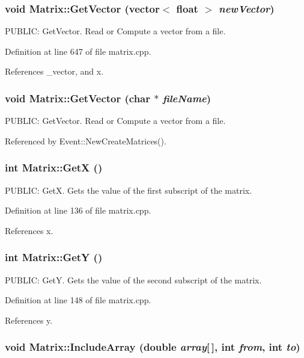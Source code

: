 \subsubsection{\setlength{\rightskip}{0pt plus 5cm}void Matrix::Get\-Vector (vector$<$ float $>$ {\em new\-Vector})}\label{classMatrix_a7}


PUBLIC: Get\-Vector. Read or Compute a vector from a file. 

Definition at line 647 of file matrix.cpp.

References \_\-vector, and x.
\subsubsection{\setlength{\rightskip}{0pt plus 5cm}void Matrix::Get\-Vector (char $\ast$ {\em file\-Name})}\label{classMatrix_a6}


PUBLIC: Get\-Vector. Read or Compute a vector from a file. 

Referenced by Event::New\-Create\-Matrices().
\subsubsection{\setlength{\rightskip}{0pt plus 5cm}int Matrix::Get\-X ()}\label{classMatrix_a30}


PUBLIC: Get\-X. Gets the value of the first subscript of the matrix. 

Definition at line 136 of file matrix.cpp.

References x.
\subsubsection{\setlength{\rightskip}{0pt plus 5cm}int Matrix::Get\-Y ()}\label{classMatrix_a31}


PUBLIC: Get\-Y. Gets the value of the second subscript of the matrix. 

Definition at line 148 of file matrix.cpp.

References y.
\subsubsection{\setlength{\rightskip}{0pt plus 5cm}void Matrix::Include\-Array (double {\em array}[$\,$], int {\em from}, int {\em to})}\label{classMatrix_a5}



